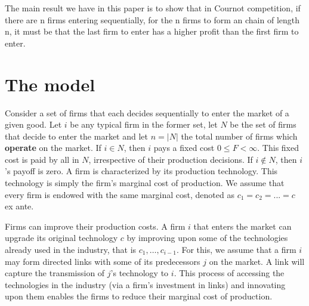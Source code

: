 \documentclass{article}
\begin{document}
The main result we have in this paper is to show that in Cournot competition, if there are n firms entering sequentially, for the n firms to form an chain of length n, it must be that the last firm to enter has a higher profit than the first firm to enter. 

\section{The model}

\indent Consider a set of firms that each decides sequentially to enter the market of a given good. Let $i$ be any typical firm in the former set, let $N$ be the set of firms that decide to enter the market and let $n=|N|$ the total number of firms which \textbf{operate} on the market. If $i\in N$, then $i$ pays a fixed cost $0\leq F< \infty$. This fixed cost is paid by all in $N$, irrespective of their production decisions. If $i\notin N$, then $i$'s payoff is zero. A firm is characterized by its production technology. This technology is simply the firm's marginal cost of production. We assume that every firm is endowed with the same marginal cost, denoted as $c_1=c_2=...=c$ ex ante. 

\indent Firms can improve their production costs. A firm $i$ that enters the market can upgrade its original technology $c$ by improving upon some of the technologies already used in the industry, that is $c_1,\ldots, c_{i-1}$. For this, we assume that a firm $i$ may form directed links with some of its predecessors $j$ on the market. A link will capture the transmission of $j$'s technology to $i$. This process of accessing the technologies in the industry (via a firm's investment in links) and innovating upon them enables the firms to reduce their marginal cost of production. 
\end{document}
